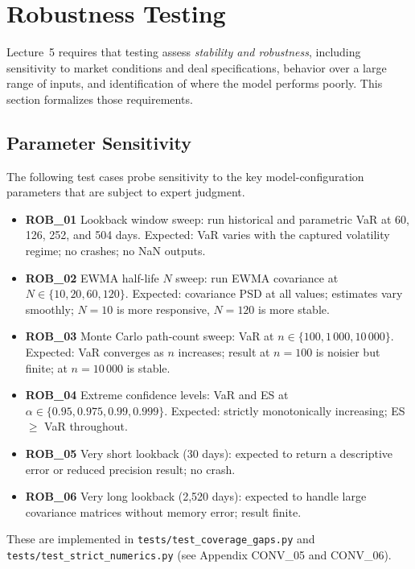 \documentclass[11pt]{article}
\newcommand{\code}[1]{\texttt{#1}}
\begin{document}
\section{Robustness Testing}

Lecture~5 requires that testing assess \emph{stability and robustness},
including sensitivity to market conditions and deal specifications,
behavior over a large range of inputs, and identification of where the
model performs poorly.  This section formalizes those requirements.

\subsection{Parameter Sensitivity}

The following test cases probe sensitivity to the key model-configuration
parameters that are subject to expert judgment.

\begin{itemize}
  \item \textbf{ROB\_01} Lookback window sweep: run historical and parametric
    VaR at 60, 126, 252, and 504 days.  Expected: VaR varies with the
    captured volatility regime; no crashes; no NaN outputs.
  \item \textbf{ROB\_02} EWMA half-life $N$ sweep: run EWMA covariance at
    $N \in \{10, 20, 60, 120\}$.  Expected: covariance PSD at all values;
    estimates vary smoothly; $N=10$ is more responsive, $N=120$ is more stable.
  \item \textbf{ROB\_03} Monte Carlo path-count sweep: VaR at $n \in
    \{100, 1\,000, 10\,000\}$.  Expected: VaR converges as $n$ increases;
    result at $n = 100$ is noisier but finite; at $n = 10\,000$ is stable.
  \item \textbf{ROB\_04} Extreme confidence levels: VaR and ES at
    $\alpha \in \{0.95, 0.975, 0.99, 0.999\}$.  Expected: strictly
    monotonically increasing; ES $\geq$ VaR throughout.
  \item \textbf{ROB\_05} Very short lookback (30 days): expected to return
    a descriptive error or reduced precision result; no crash.
  \item \textbf{ROB\_06} Very long lookback (2,520 days): expected to handle
    large covariance matrices without memory error; result finite.
\end{itemize}

These are implemented in \code{tests/test\_coverage\_gaps.py} and
\code{tests/test\_strict\_numerics.py} (see Appendix CONV\_05 and CONV\_06).
\end{document}
